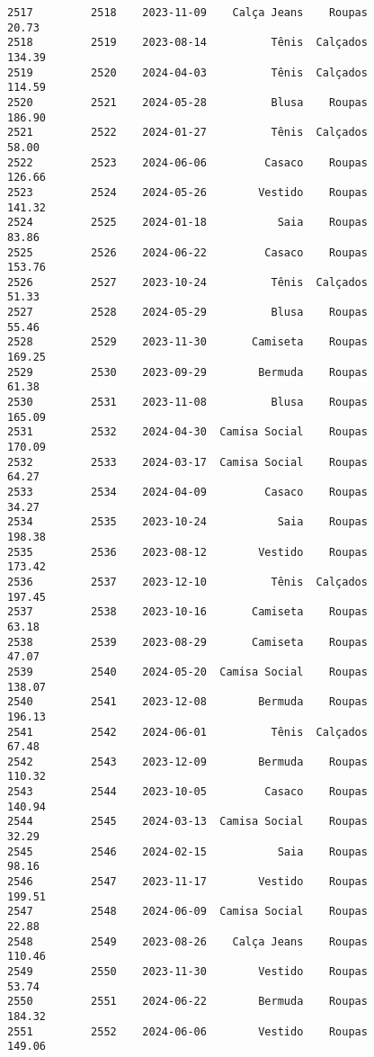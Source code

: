 \documentclass[11pt]{article}
\begin{document}
\begin{Verbatim}[commandchars=\\\{\}]
2517         2518    2023-11-09    Calça Jeans    Roupas           20.73   
2518         2519    2023-08-14          Tênis  Calçados          134.39   
2519         2520    2024-04-03          Tênis  Calçados          114.59   
2520         2521    2024-05-28          Blusa    Roupas          186.90   
2521         2522    2024-01-27          Tênis  Calçados           58.00   
2522         2523    2024-06-06         Casaco    Roupas          126.66   
2523         2524    2024-05-26        Vestido    Roupas          141.32   
2524         2525    2024-01-18           Saia    Roupas           83.86   
2525         2526    2024-06-22         Casaco    Roupas          153.76   
2526         2527    2023-10-24          Tênis  Calçados           51.33   
2527         2528    2024-05-29          Blusa    Roupas           55.46   
2528         2529    2023-11-30       Camiseta    Roupas          169.25   
2529         2530    2023-09-29        Bermuda    Roupas           61.38   
2530         2531    2023-11-08          Blusa    Roupas          165.09   
2531         2532    2024-04-30  Camisa Social    Roupas          170.09   
2532         2533    2024-03-17  Camisa Social    Roupas           64.27   
2533         2534    2024-04-09         Casaco    Roupas           34.27   
2534         2535    2023-10-24           Saia    Roupas          198.38   
2535         2536    2023-08-12        Vestido    Roupas          173.42   
2536         2537    2023-12-10          Tênis  Calçados          197.45   
2537         2538    2023-10-16       Camiseta    Roupas           63.18   
2538         2539    2023-08-29       Camiseta    Roupas           47.07   
2539         2540    2024-05-20  Camisa Social    Roupas          138.07   
2540         2541    2023-12-08        Bermuda    Roupas          196.13   
2541         2542    2024-06-01          Tênis  Calçados           67.48   
2542         2543    2023-12-09        Bermuda    Roupas          110.32   
2543         2544    2023-10-05         Casaco    Roupas          140.94   
2544         2545    2024-03-13  Camisa Social    Roupas           32.29   
2545         2546    2024-02-15           Saia    Roupas           98.16   
2546         2547    2023-11-17        Vestido    Roupas          199.51   
2547         2548    2024-06-09  Camisa Social    Roupas           22.88   
2548         2549    2023-08-26    Calça Jeans    Roupas          110.46   
2549         2550    2023-11-30        Vestido    Roupas           53.74   
2550         2551    2024-06-22        Bermuda    Roupas          184.32   
2551         2552    2024-06-06        Vestido    Roupas          149.06   

\end{Verbatim}
\end{document}
